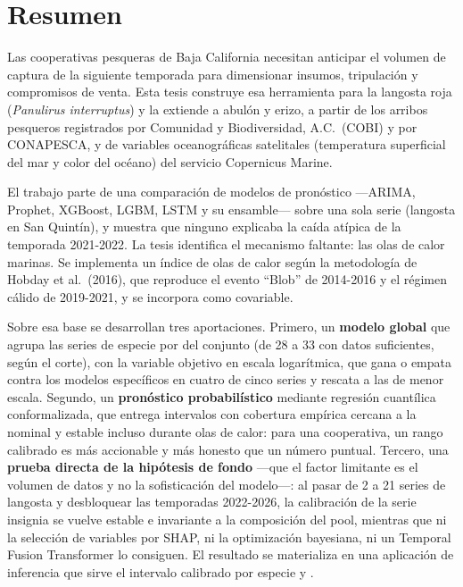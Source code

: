 \chapter*{Resumen}

Las cooperativas pesqueras de Baja California necesitan anticipar el volumen de captura de
la siguiente temporada para dimensionar insumos, tripulación y compromisos de venta. Esta
tesis construye esa herramienta para la langosta roja (\emph{Panulirus interruptus}) y la
extiende a abulón y erizo, a partir de los arribos pesqueros registrados por Comunidad y
Biodiversidad, A.C.\ (COBI) y por CONAPESCA, y de variables oceanográficas satelitales
(temperatura superficial del mar y color del océano) del servicio Copernicus Marine.

El trabajo parte de una comparación de modelos de pronóstico ---ARIMA, Prophet, XGBoost,
LGBM, LSTM y su ensamble--- sobre una sola serie (langosta en San Quintín), y muestra que
ninguno explicaba la caída atípica de la temporada 2021-2022. La tesis identifica el
mecanismo faltante: las olas de calor marinas. Se implementa un índice de olas de calor
según la metodología de Hobday et al.\ (2016), que reproduce el evento ``Blob'' de 2014-2016
y el régimen cálido de 2019-2021, y se incorpora como covariable.

Sobre esa base se desarrollan tres aportaciones. Primero, un \textbf{modelo global} que
agrupa las series de especie por \ue{} del conjunto (de 28 a 33 con datos suficientes, según
el corte), con la variable objetivo en escala logarítmica, que
gana o empata contra los modelos específicos en cuatro de cinco series y rescata a las de
menor escala. Segundo, un \textbf{pronóstico probabilístico} mediante regresión cuantílica
conformalizada, que entrega intervalos con cobertura empírica cercana a la nominal y estable
incluso durante olas de calor: para una cooperativa, un rango calibrado es más accionable y
más honesto que un número puntual. Tercero, una \textbf{prueba directa de la hipótesis de
fondo} ---que el factor limitante es el volumen de datos y no la sofisticación del
modelo---: al pasar de 2 a 21 series de langosta y desbloquear las temporadas 2022-2026, la
calibración de la serie insignia se vuelve estable e invariante a la composición del pool,
mientras que ni la selección de variables por SHAP, ni la optimización bayesiana, ni un
Temporal Fusion Transformer lo consiguen. El resultado se materializa en una aplicación de
inferencia que sirve el intervalo calibrado por especie y \ue{}.

